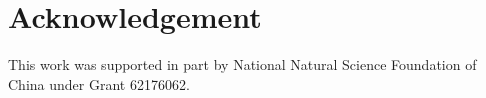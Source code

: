 \section*{Acknowledgement}
\label{sec:acknowledgement}
This work was supported in part by National Natural Science Foundation of China under Grant 62176062.

